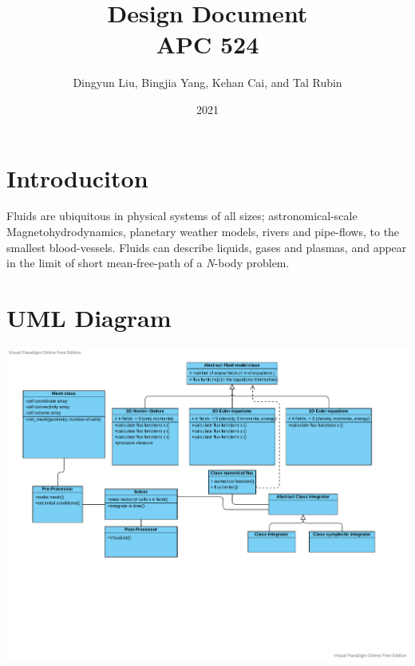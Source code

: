 \documentclass[aip, amsmath, amssymb, preprint,floatfix]{revtex4-2}
\begin{document}
\title{Design Document\\APC 524}
\date{2021}

\author{Dingyun Liu, Bingjia Yang, Kehan Cai, and Tal Rubin}
\maketitle

\section{Introduciton}

Fluids are ubiquitous in physical systems of all sizes; astronomical-scale Magnetohydrodynamics, planetary weather models, rivers and pipe-flows, to the smallest blood-vessels. Fluids can describe liquids, gases and plasmas, and appear in the limit of short mean-free-path of a \textit{N}-body problem.




\section{UML Diagram}
\includegraphics[width = \linewidth]{APC524UML.pdf}


\end{document}
